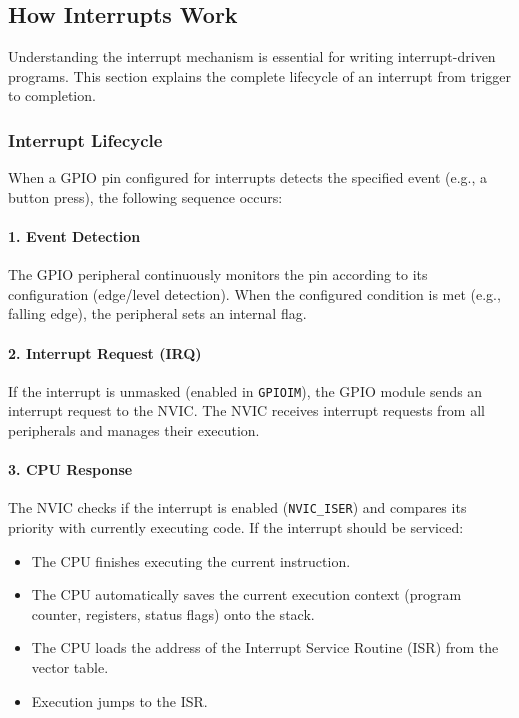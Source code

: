 \subsection{How Interrupts Work}

Understanding the interrupt mechanism is essential for writing interrupt-driven programs. This section explains the complete lifecycle of an interrupt from trigger to completion.

\subsubsection{Interrupt Lifecycle}

When a GPIO pin configured for interrupts detects the specified event (e.g., a button press), the following sequence occurs:

\paragraph{1. Event Detection}
The GPIO peripheral continuously monitors the pin according to its configuration (edge/level detection). When the configured condition is met (e.g., falling edge), the peripheral sets an internal flag.

\paragraph{2. Interrupt Request (IRQ)}
If the interrupt is unmasked (enabled in \texttt{GPIOIM}), the GPIO module sends an interrupt request to the NVIC. The NVIC receives interrupt requests from all peripherals and manages their execution.

\paragraph{3. CPU Response}
The NVIC checks if the interrupt is enabled (\texttt{NVIC\_ISER}) and compares its priority with currently executing code. If the interrupt should be serviced:
\begin{itemize}[nosep]
  \item The CPU finishes executing the current instruction.
  \item The CPU automatically saves the current execution context (program counter, registers, status flags) onto the stack.
  \item The CPU loads the address of the Interrupt Service Routine (ISR) from the vector table.
  \item Execution jumps to the ISR.
\end{itemize}

